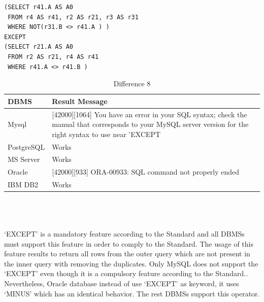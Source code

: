 \begin{mdframed}[backgroundcolor=lightgray!20]
\begin{lstlisting}[style=SQL]
(SELECT r41.A AS A0
 FROM r4 AS r41, r2 AS r21, r3 AS r31
 WHERE NOT(r31.B <> r41.A ) )
EXCEPT
(SELECT r21.A AS A0
 FROM r2 AS r21, r4 AS r41
 WHERE r41.A <> r41.B )
\end{lstlisting}
\end{mdframed}

\begin{table}[h]
\centering
\caption{Difference 8}
\label{my-label}
\begin{tabular}{|p{2cm}|p{11.5cm}|}
\hline
\textbf{DBMS} & \textbf{Result Message}                                                                                                                                             \\ \hline
Mysql         & {[}42000{]}{[}1064{]} You have an error in your SQL syntax; check the manual that corresponds to your MySQL server version for the right syntax to use near 'EXCEPT \\ \hline
PostgreSQL    & Works                                                                                                                                                               \\ \hline
MS Server     & Works                                                                                                                                                               \\ \hline
Oracle        & {[}42000{]}{[}933{]} ORA-00933: SQL command not properly ended                                                                                                      \\ \hline
IBM DB2       & Works                                                                                                                                                               \\ \hline
\end{tabular}
\end{table}

\hfill\\\\\\
‘EXCEPT’ is a mandatory feature according to the Standard and all DBMSs must support this feature in order to comply to the Standard. The usage of this feature results to return all rows from the outer query which are not present in the inner query with removing the duplicates. Only MySQL does not support the ‘EXCEPT’ even though it is a compulsory feature according to the Standard.. Nevertheless, Oracle database instead of use  ‘EXCEPT’ as keyword, it uses ‘MINUS’ which has an identical behavior. The rest DBMSs support this operator. 


